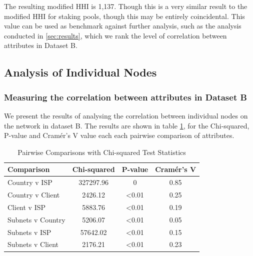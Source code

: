 \documentclass[conference]{IEEEtran}
\begin{document}
The resulting modified HHI is 1,137. Though this is a very similar result to the modified HHI for staking pools, though this may be entirely coincidental.  This value can be used as benchmark against further analysis, such as the analysis conducted in \ref{sec:results}, which we rank the level of correlation between attributes in Dataset B. 

\subsection{Analysis of Individual Nodes}

\subsubsection{Measuring the correlation between attributes in Dataset B}

We present the results of analysing the correlation between individual nodes on the network in dataset B. The results are shown in table \ref{tab:pairwise-comparisons-dataset-b}, for the Chi-squared, P-value and Cramér's V value each each pairwise comparison of attributes.

\begin{table}[ht]
    \centering
    \renewcommand{\arraystretch}{1.5}
    \begin{tabular}{|p{2.5cm}|c|c|c|}
        \hline
        \textbf{Comparison} & \textbf{Chi-squared} & \textbf{P-value} & \textbf{Cramér's V} \\
        \hline
        Country v ISP & 327297.96 & 0 & 0.85 \\ \hline
        Country v Client & 2426.12 & \textless 0.01 & 0.25 \\ \hline
        Client v ISP & 5883.76 & \textless 0.01 & 0.19 \\ \hline
        Subnets v Country & 5206.07 & \textless 0.01 & 0.05 \\ \hline
        Subnets v ISP & 57642.02 & \textless 0.01 & 0.15 \\ \hline
        Subnets v Client & 2176.21 & \textless 0.01 & 0.23 \\ \hline
    \end{tabular}
    \vspace{10pt}
    \caption{Pairwise Comparisons with Chi-squared Test Statistics}
    \label{tab:pairwise-comparisons-dataset-b}
\end{table}
\end{document}
